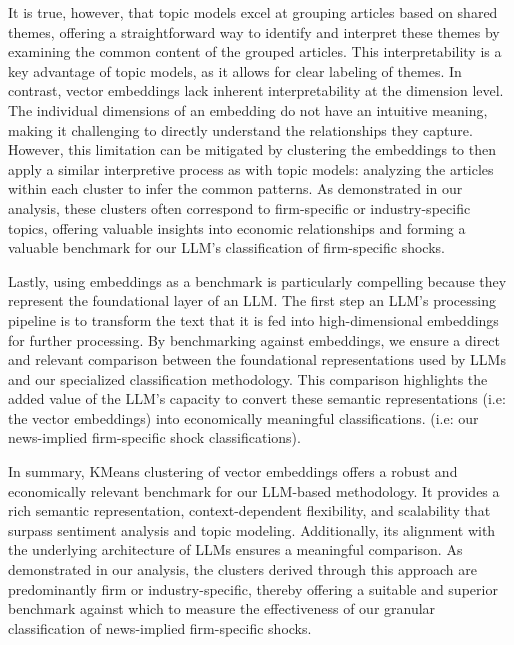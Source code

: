 
It is true, however, that topic models excel at grouping articles based on shared themes, offering a straightforward way to identify and interpret these themes by examining the common content of the grouped articles. This interpretability is a key advantage of topic models, as it allows for clear labeling of themes. In contrast, vector embeddings lack inherent interpretability at the dimension level. The individual dimensions of an embedding do not have an intuitive meaning, making it challenging to directly understand the relationships they capture. However, this limitation can be mitigated by clustering the embeddings to then apply a similar interpretive process as with topic models: analyzing the articles within each cluster to infer the common patterns. As demonstrated in our analysis, these clusters often correspond to firm-specific or industry-specific topics, offering valuable insights into economic relationships and forming a valuable benchmark for our LLM's classification of firm-specific shocks.

Lastly, using embeddings as a benchmark is particularly compelling because they represent the foundational layer of an LLM. The first step an LLM's processing pipeline is to transform the text that it is fed into high-dimensional embeddings for further processing. By benchmarking against embeddings, we ensure a direct and relevant comparison between the foundational representations used by LLMs and our specialized classification methodology. This comparison highlights the added value of the LLM's capacity to convert these semantic representations (i.e: the vector embeddings) into economically meaningful classifications. (i.e: our news-implied firm-specific shock classifications).

In summary, KMeans clustering of vector embeddings offers a robust and economically relevant benchmark for our LLM-based methodology. It provides a rich semantic representation, context-dependent flexibility, and scalability that surpass sentiment analysis and topic modeling. Additionally, its alignment with the underlying architecture of LLMs ensures a meaningful comparison. As demonstrated in our analysis, the clusters derived through this approach are predominantly firm or industry-specific, thereby offering a suitable and superior benchmark against which to measure the effectiveness of our granular classification of news-implied firm-specific shocks.
